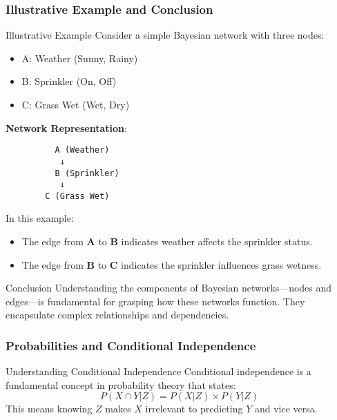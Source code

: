 \documentclass[aspectratio=169]{beamer}
\begin{document}
\begin{frame}[fragile]
    \frametitle{Illustrative Example and Conclusion}
    \begin{block}{Illustrative Example}
        Consider a simple Bayesian network with three nodes: 
        \begin{itemize}
            \item A: Weather (Sunny, Rainy)
            \item B: Sprinkler (On, Off)
            \item C: Grass Wet (Wet, Dry)
        \end{itemize}
        \textbf{Network Representation}:
        \begin{center}
        \begin{verbatim}
          A (Weather)
           ↓
          B (Sprinkler) 
           ↓
        C (Grass Wet)
        \end{verbatim}
        \end{center}
        In this example: 
        \begin{itemize}
            \item The edge from \textbf{A} to \textbf{B} indicates weather affects the sprinkler status.
            \item The edge from \textbf{B} to \textbf{C} indicates the sprinkler influences grass wetness.
        \end{itemize}
    \end{block}

    \begin{block}{Conclusion}
        Understanding the components of Bayesian networks—nodes and edges—is fundamental for grasping how these networks function. They encapsulate complex relationships and dependencies.
    \end{block}
\end{frame}

\begin{frame}[fragile]
    \frametitle{Probabilities and Conditional Independence}
    \begin{block}{Understanding Conditional Independence}
        Conditional independence is a fundamental concept in probability theory that states:
        \[
        P(X \cap Y | Z) = P(X | Z) \times P(Y | Z)
        \]
        This means knowing \(Z\) makes \(X\) irrelevant to predicting \(Y\) and vice versa.
    \end{block}
\end{frame}
\end{document}
